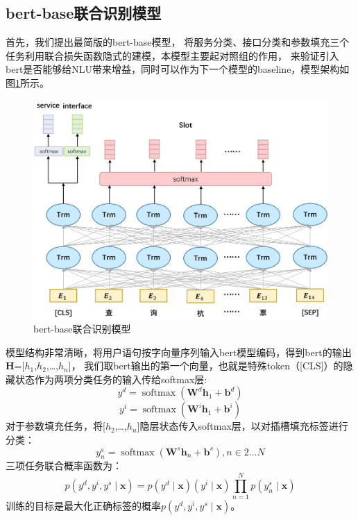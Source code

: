 \subsection{bert-base联合识别模型}
首先，我们提出最简版的bert-base模型，
将服务分类、接口分类和参数填充三个任务利用联合损失函数隐式的建模，本模型主要起对照组的作用，
来验证引入bert是否能够给NLU带来增益，同时可以作为下一个模型的baseline，模型架构如图\ref{fig:bert-base}所示。

\begin{figure}[htbp]
  \centering
  \includegraphics[width=15cm]{./images/bert-base.jpg}
  \caption{bert-base联合识别模型}
  \label{fig:bert-base}
\end{figure}

模型结构非常清晰，将用户语句按字向量序列输入bert模型编码，得到bert的输出$\mathbf{H}$=[$h_{1}$,$h_{2}$,\dots,$h_{n}$]，
我们取bert输出的第一个向量，也就是特殊token（[CLS]）的隐藏状态作为两项分类任务的输入传给softmax层:
\begin{equation}
  y^{d}=\operatorname{softmax}\left(\mathbf{W}^{d} \boldsymbol{h}_{1}+\boldsymbol{b}^{d}\right)
\end{equation}
\begin{equation}
  y^{i}=\operatorname{softmax}\left(\mathbf{W}^{i} \boldsymbol{h}_{1}+\boldsymbol{b}^{i}\right)
\end{equation}
对于参数填充任务，将[$h_{2}$,\dots,$h_{n}$]隐层状态传入softmax层，以对插槽填充标签进行分类：
\begin{equation}
y_{n}^{s}=\operatorname{softmax}\left(\mathbf{W}^{s} \boldsymbol{h}_{n}+\boldsymbol{b}^{s}\right), n \in 2 \ldots N
\end{equation}
三项任务联合概率函数为：
\begin{equation}
  p\left(y^{d},y^{i}, y^{s} \mid \boldsymbol{x}\right)=p\left(y^{d} \mid \boldsymbol{x}\right) \left(y^{i} \mid \boldsymbol{x}\right) \prod_{n=1}^{N} p\left(y_{n}^{s} \mid \boldsymbol{x}\right)
  \end{equation}
  训练的目标是最大化正确标签的概率$p\left(y^{d},y^{i}, y^{s} \mid \boldsymbol{x}\right)$。


